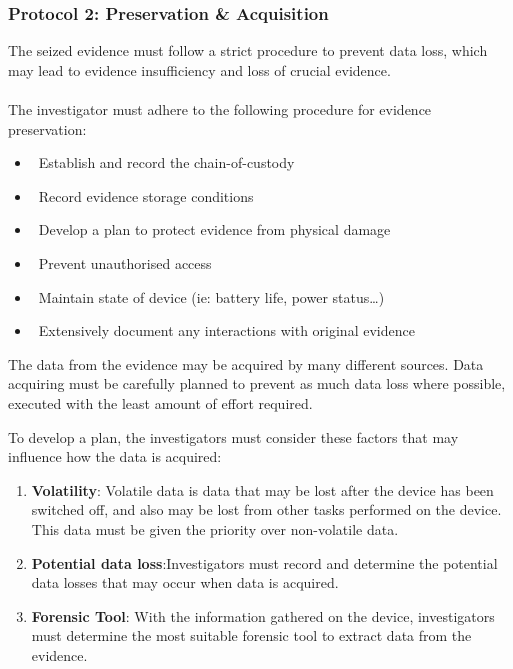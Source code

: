 \documentclass[a4paper]{report}
\newcommand{\checkbox}{\ding{113}}
\begin{document}
\begin{justify}
\subsubsection{Protocol 2: Preservation \& Acquisition}
The seized evidence must follow a strict procedure to prevent data loss, which may lead to evidence insufficiency and loss of crucial evidence. 
\\
\\
The investigator must adhere to the following procedure for evidence preservation: 

\begin{itemize}
    \item \checkbox\ Establish and record the chain-of-custody
    \item \checkbox\ Record evidence storage conditions  
    \item \checkbox\ Develop a plan to protect evidence from physical damage
    \item \checkbox\ Prevent unauthorised access 
    \item \checkbox\ Maintain state of device (ie: battery life, power status…) 
    \item \checkbox\ Extensively document any interactions with original evidence 
\end{itemize}

The data from the evidence may be acquired by many different sources. Data acquiring must be carefully planned to prevent as much data loss where possible, executed with the least amount of effort required.

To develop a plan, the investigators must consider these factors that may influence how the data is acquired: 

\begin{enumerate}
    \item \textbf{Volatility}: Volatile data is data that may be lost after the device has been switched off, and also may be lost from other tasks performed on the device. This data must be given the priority over non-volatile data. 
    \item \textbf{Potential data loss}:Investigators must record and determine the potential data losses that may occur when data is acquired. 
    \item \textbf{Forensic Tool}: With the information gathered on the device, investigators must determine the most suitable forensic tool to extract data from the evidence.
\end{enumerate}


\end{justify}
\end{document}
